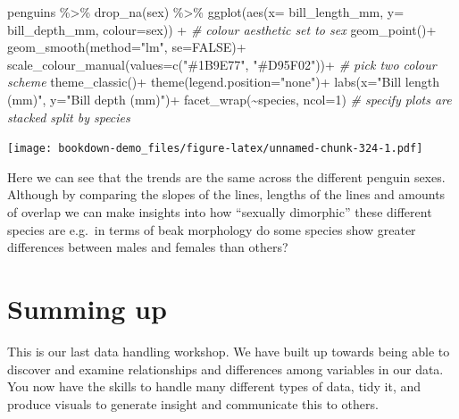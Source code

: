 \documentclass[
]{book}
\newenvironment{Shaded}{\begin{snugshade}}{\end{snugshade}}
\newcommand{\AttributeTok}[1]{\textcolor[rgb]{0.77,0.63,0.00}{#1}}
\newcommand{\CommentTok}[1]{\textcolor[rgb]{0.56,0.35,0.01}{\textit{#1}}}
\newcommand{\ConstantTok}[1]{\textcolor[rgb]{0.00,0.00,0.00}{#1}}
\newcommand{\DecValTok}[1]{\textcolor[rgb]{0.00,0.00,0.81}{#1}}
\newcommand{\FunctionTok}[1]{\textcolor[rgb]{0.00,0.00,0.00}{#1}}
\newcommand{\NormalTok}[1]{#1}
\newcommand{\SpecialCharTok}[1]{\textcolor[rgb]{0.00,0.00,0.00}{#1}}
\newcommand{\StringTok}[1]{\textcolor[rgb]{0.31,0.60,0.02}{#1}}
\begin{document}
\begin{Shaded}
\begin{Highlighting}[]
\NormalTok{penguins }\SpecialCharTok{\%\textgreater{}\%} 
  \FunctionTok{drop\_na}\NormalTok{(sex) }\SpecialCharTok{\%\textgreater{}\%} 
\FunctionTok{ggplot}\NormalTok{(}\FunctionTok{aes}\NormalTok{(}\AttributeTok{x=}\NormalTok{ bill\_length\_mm, }
                     \AttributeTok{y=}\NormalTok{ bill\_depth\_mm,}
                     \AttributeTok{colour=}\NormalTok{sex)) }\SpecialCharTok{+} \CommentTok{\# colour aesthetic set to sex}
    \FunctionTok{geom\_point}\NormalTok{()}\SpecialCharTok{+}
  \FunctionTok{geom\_smooth}\NormalTok{(}\AttributeTok{method=}\StringTok{"lm"}\NormalTok{,}
              \AttributeTok{se=}\ConstantTok{FALSE}\NormalTok{)}\SpecialCharTok{+}
  \FunctionTok{scale\_colour\_manual}\NormalTok{(}\AttributeTok{values=}\FunctionTok{c}\NormalTok{(}\StringTok{"\#1B9E77"}\NormalTok{, }\StringTok{"\#D95F02"}\NormalTok{))}\SpecialCharTok{+} \CommentTok{\# pick two colour scheme}
  \FunctionTok{theme\_classic}\NormalTok{()}\SpecialCharTok{+}
  \FunctionTok{theme}\NormalTok{(}\AttributeTok{legend.position=}\StringTok{"none"}\NormalTok{)}\SpecialCharTok{+}
    \FunctionTok{labs}\NormalTok{(}\AttributeTok{x=}\StringTok{"Bill length (mm)"}\NormalTok{,}
         \AttributeTok{y=}\StringTok{"Bill depth (mm)"}\NormalTok{)}\SpecialCharTok{+}
  \FunctionTok{facet\_wrap}\NormalTok{(}\SpecialCharTok{\textasciitilde{}}\NormalTok{species, }\AttributeTok{ncol=}\DecValTok{1}\NormalTok{) }\CommentTok{\# specify plots are stacked split by species}
\end{Highlighting}
\end{Shaded}

\texttt{[image: bookdown-demo\_files/figure-latex/unnamed-chunk-324-1.pdf]}

Here we can see that the trends are the same across the different penguin sexes. Although by comparing the slopes of the lines, lengths of the lines and amounts of overlap we can make insights into how ``sexually dimorphic'' these different species are e.g.~in terms of beak morphology do some species show greater differences between males and females than others?

\hypertarget{summing-up-3}{%
\section{Summing up}\label{summing-up-3}}

This is our last data handling workshop. We have built up towards being able to discover and examine relationships and differences among variables in our data. You now have the skills to handle many different types of data, tidy it, and produce visuals to generate insight and communicate this to others.
\end{document}
